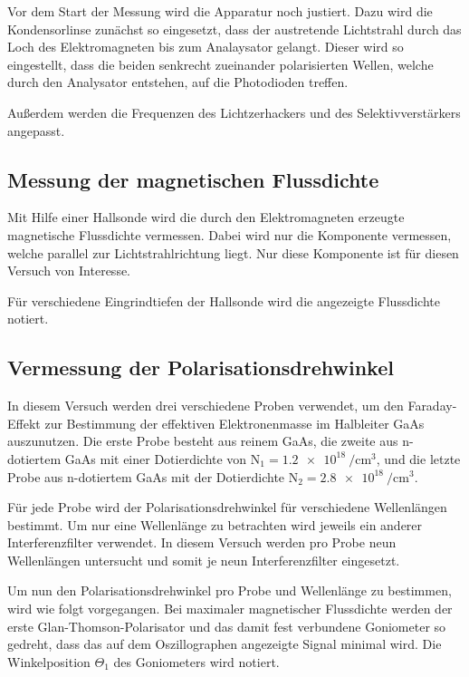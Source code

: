 Vor dem Start der Messung wird die Apparatur noch justiert. 
Dazu wird die Kondensorlinse zunächst so eingesetzt, dass der 
austretende Lichtstrahl durch das Loch des Elektromagneten 
bis zum Analaysator gelangt. Dieser wird so eingestellt, dass 
die beiden senkrecht zueinander polarisierten Wellen, welche 
durch den Analysator entstehen, auf die Photodioden treffen.

Außerdem werden die Frequenzen des Lichtzerhackers und 
des Selektivverstärkers angepasst. 

%
\subsection{Messung der magnetischen Flussdichte}
%

Mit Hilfe einer Hallsonde wird die durch den Elektromagneten 
erzeugte magnetische Flussdichte vermessen. Dabei wird 
nur die Komponente vermessen, welche parallel zur 
Lichtstrahlrichtung liegt. Nur diese Komponente ist 
für diesen Versuch von Interesse. 

Für verschiedene Eingrindtiefen der Hallsonde wird die 
angezeigte Flussdichte notiert.

%
\subsection{Vermessung der Polarisationsdrehwinkel}
%

In diesem Versuch werden drei verschiedene Proben 
verwendet, um den Faraday-Effekt zur Bestimmung der 
effektiven Elektronenmasse im Halbleiter GaAs auszunutzen. 
Die erste Probe besteht aus reinem GaAs, die zweite  aus 
n-dotiertem GaAs mit einer Dotierdichte von 
$\text{N}_1 =\SI{1.2e18}{\per\centi\metre^3}$, und 
die letzte Probe aus n-dotiertem GaAs mit der 
Dotierdichte 
$\text{N}_2 =\SI{2.8e18}{\per\centi\metre^3}$.

Für jede Probe wird der Polarisationsdrehwinkel für 
verschiedene Wellenlängen bestimmt. Um nur 
eine Wellenlänge zu betrachten wird jeweils ein 
anderer Interferenzfilter verwendet. In diesem 
Versuch werden pro Probe neun Wellenlängen untersucht und 
somit je neun Interferenzfilter eingesetzt.

Um nun den Polarisationsdrehwinkel pro Probe und Wellenlänge 
zu bestimmen, wird wie folgt vorgegangen. 
Bei maximaler magnetischer Flussdichte werden der erste 
Glan-Thomson-Polarisator und das damit fest verbundene 
Goniometer so gedreht, dass das auf dem Oszillographen angezeigte 
Signal minimal wird. Die Winkelposition $\Theta_1$ des Goniometers 
wird notiert.


